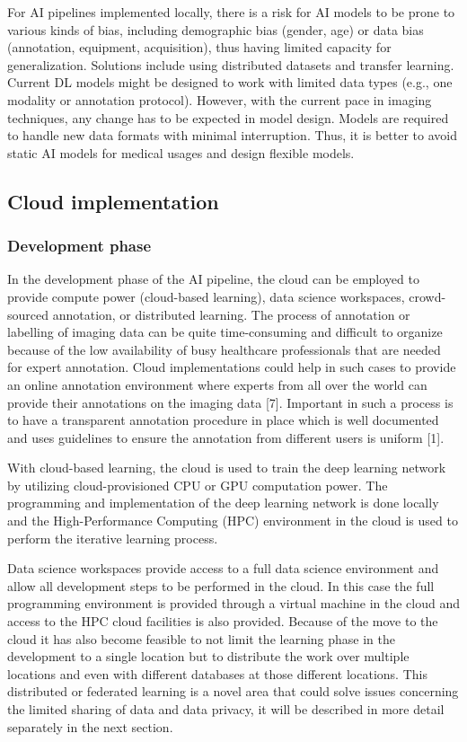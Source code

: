 For AI pipelines implemented locally, there is a risk for AI models to be prone to various kinds of bias, including demographic bias (gender, age) or data bias (annotation, equipment, acquisition), thus having limited capacity for generalization. Solutions include using distributed datasets and transfer learning. Current DL models might be designed to work with limited data types (e.g., one modality or annotation protocol). However, with the current pace in imaging techniques, any change has to be expected in model design. Models are required to handle new data formats with minimal interruption. Thus, it is better to avoid static AI models for medical usages and design flexible models.
\subsection{Cloud implementation}
\subsubsection{Development phase}
In the development phase of the AI pipeline, the cloud can be employed to provide compute power (cloud-based learning), data science workspaces, crowd-sourced annotation, or distributed learning.
The process of annotation or labelling of imaging data can be quite time-consuming and difficult to organize because of the low availability of busy healthcare professionals that are needed for expert annotation. Cloud implementations could help in such cases to provide an online annotation environment where experts from all over the world can provide their annotations on the imaging data [7]. Important in such a process is to have a transparent annotation procedure in place which is well documented and uses guidelines to ensure the annotation from different users is uniform [1].


With cloud-based learning, the cloud is used to train the deep learning network by utilizing cloud-provisioned CPU or GPU computation power. The programming and implementation of the deep learning network is done locally and the High-Performance Computing (HPC) environment in the cloud is used to perform the iterative learning process. 


Data science workspaces provide access to a full data science environment and allow all development steps to be performed in the cloud. In this case the full programming environment is provided through a virtual machine in the cloud and access to the HPC cloud facilities is also provided.
Because of the move to the cloud it has also become feasible to not limit the learning phase in the development to a single location but to distribute the work over multiple locations and even with different databases at those different locations. This distributed or federated learning is a novel area that could solve issues concerning the limited sharing of data and data privacy, it will be described in more detail separately in the next section.



